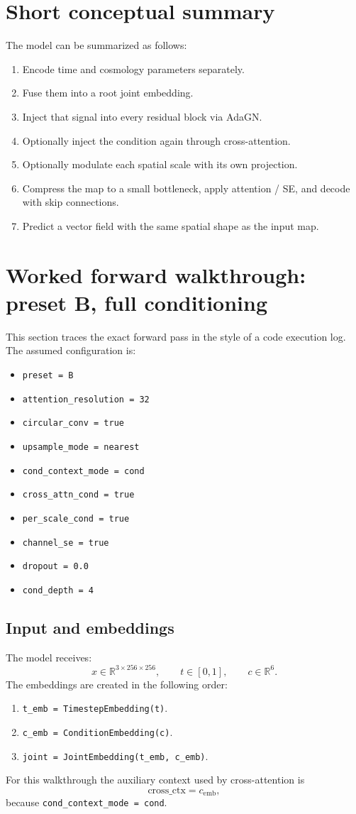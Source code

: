 \documentclass[11pt]{article}
\begin{document}
\section{Short conceptual summary}
The model can be summarized as follows:
\begin{enumerate}
  \item Encode time and cosmology parameters separately.
  \item Fuse them into a root joint embedding.
  \item Inject that signal into every residual block via AdaGN.
  \item Optionally inject the condition again through cross-attention.
  \item Optionally modulate each spatial scale with its own projection.
  \item Compress the map to a small bottleneck, apply attention / SE, and decode with skip connections.
  \item Predict a vector field with the same spatial shape as the input map.
\end{enumerate}

\section{Worked forward walkthrough: preset B, full conditioning}
This section traces the exact forward pass in the style of a code execution log.
The assumed configuration is:
\begin{itemize}
  \item \texttt{preset = B}
  \item \texttt{attention\_resolution = 32}
  \item \texttt{circular\_conv = true}
  \item \texttt{upsample\_mode = nearest}
  \item \texttt{cond\_context\_mode = cond}
  \item \texttt{cross\_attn\_cond = true}
  \item \texttt{per\_scale\_cond = true}
  \item \texttt{channel\_se = true}
  \item \texttt{dropout = 0.0}
  \item \texttt{cond\_depth = 4}
\end{itemize}

\subsection{Input and embeddings}
The model receives:
\[
x \in \mathbb{R}^{3 \times 256 \times 256}, \qquad t \in [0,1], \qquad c \in \mathbb{R}^6.
\]
The embeddings are created in the following order:
\begin{enumerate}
  \item \texttt{t\_emb = TimestepEmbedding(t)}.
  \item \texttt{c\_emb = ConditionEmbedding(c)}.
  \item \texttt{joint = JointEmbedding(t\_emb, c\_emb)}.
\end{enumerate}
For this walkthrough the auxiliary context used by cross-attention is
\[
\text{cross\_ctx} = c_{\mathrm{emb}},
\]
because \texttt{cond\_context\_mode = cond}.
\end{document}
